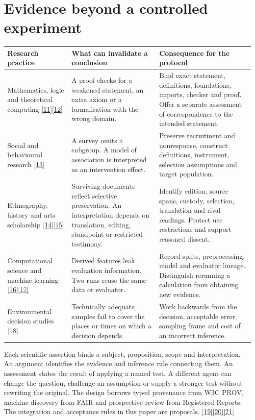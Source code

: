 \documentclass[11pt,a4paper]{article}
\newcommand{\partpage}[1]{\clearpage\section{#1}}
\newcommand{\topic}[1]{\par\smallskip{\sffamily\bfseries\color{ink}#1\par}\nobreak}
\newcommand{\src}[1]{\hyperlink{ref#1}{[#1]}}
\begin{document}
\partpage{Evidence beyond a controlled experiment}
\small
\begin{tabularx}{\linewidth}{@{}L{.225\linewidth}YY@{}}
\toprule
\textbf{Research practice} & \textbf{What can invalidate a conclusion} & \textbf{Consequence for the protocol} \\ \midrule
Mathematics, logic and theoretical computing \src{11}\src{12} & A proof checks for a weakened statement, an extra axiom or a formalisation with the wrong domain. & Bind exact statement, definitions, foundations, imports, checker and proof. Offer a separate assessment of correspondence to the intended statement. \\
Social and behavioural research \src{13} & A survey omits a subgroup. A model of association is interpreted as an intervention effect. & Preserve recruitment and nonresponse, construct definitions, instrument, selection assumptions and target population. \\
Ethnography, history and arts scholarship \src{14}\src{15} & Surviving documents reflect selective preservation. An interpretation depends on translation, editing, standpoint or restricted testimony. & Identify edition, source spans, custody, selection, translation and rival readings. Protect use restrictions and support reasoned dissent. \\
Computational science and machine learning \src{16}\src{17} & Derived features leak evaluation information. Two runs reuse the same data or evaluator. & Record splits, preprocessing, model and evaluator lineage. Distinguish rerunning a calculation from obtaining new evidence. \\
Environmental decision studies \src{18} & Technically adequate samples fail to cover the places or times on which a decision depends. & Work backwards from the decision, acceptable error, sampling frame and cost of an incorrect inference. \\
\bottomrule
\end{tabularx}
\normalsize

\topic{The proposed common contract}
Each scientific assertion binds a subject, proposition, scope and interpretation. An argument identifies the evidence and inference rule connecting them. An assessment states the result of applying a named test. A different agent can change the question, challenge an assumption or supply a stronger test without rewriting the original. The design borrows typed provenance from W3C PROV, machine discovery from FAIR and prospective review from Registered Reports. The integration and acceptance rules in this paper are proposals. \src{19}\src{20}\src{21}
\end{document}
